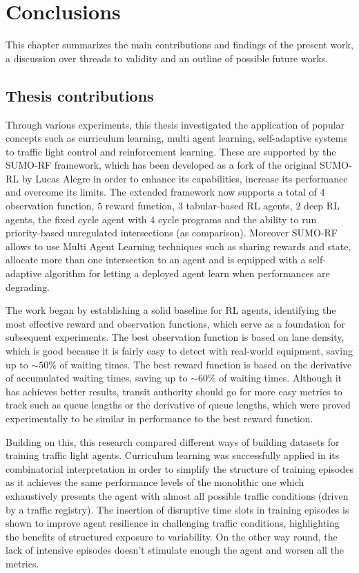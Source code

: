 \chapter{Conclusions}

This chapter summarizes the main contributions and findings of the present work, a discussion over threads to validity and an outline of possible future works.

\section{Thesis contributions}

Through various experiments, this thesis investigated the application of popular concepts such as curriculum learning, multi agent learning, self-adaptive systems to traffic light control and reinforcement learning.
These are supported by the SUMO-RF framework, which has been developed as a fork of the original SUMO-RL by Lucas Alegre in order to enhance its capabilities, increase its performance and overcome its limits.
The extended framework now supports a total of $4$ observation function, $5$ reward function, $3$ tabular-based RL agents, $2$ deep RL agents, the fixed cycle agent with $4$ cycle programs and the ability to run priority-based unregulated intersections (as comparison).
Moreover SUMO-RF allows to use Multi Agent Learning techniques such as sharing rewards and state, allocate more than one intersection to an agent and is equipped with a self-adaptive algorithm for letting a deployed agent learn when performances are degrading.

The work began by establishing a solid baseline for RL agents, identifying the most effective reward and observation functions, which serve as a foundation for subsequent experiments.
The best observation function is based on lane density, which is good because it is fairly easy to detect with real-world equipment, saving up to $\sim 50\%$ of waiting times.
The best reward function is based on the derivative of accumulated waiting times, saving up to $\sim 60\%$ of waiting times.
Although it has achieves better results, transit authority should go for more easy metrics to track such as queue lengths or the derivative of queue lengths, which were proved experimentally to be similar in performance to the best reward function.

Building on this, this research compared different ways of building datasets for training traffic light agents.
Curriculum learning was successfully applied in its combinatorial interpretation in order to simplify the structure of training episodes as it achieves the same performance levels of the monolithic one which exhaustively presents the agent with almost all possible traffic conditions (driven by a traffic registry).
The insertion of disruptive time slots in training episodes is shown to improve agent resilience in challenging traffic conditions, highlighting the benefits of structured exposure to variability.
On the other way round, the lack of intensive episodes doesn't stimulate enough the agent and worsen all the metrics.

